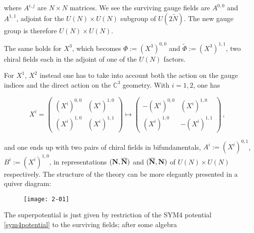where $A^{i,j}$ are $N\times N$ matrices. We see the surviving gauge fields are $A^{0,0}$ and $A^{1,1}$, adjoint for the $U(N) \times U(N)$ subgroup of $U(2\tilde N)$. The new gauge group is therefore $U(N) \times U(N)$.

The same holds for $X^3$, which becomes $\Phi := (X^3)^{0,0}$ and $\tilde \Phi := (X^3)^{1,1}$, two chiral fields each in the adjoint of one of the $U(N)$ factors.

For $X^1$, $X^2$ instead one has to take into account both the action on the gauge indices and the direct action on the $\mathbb{C}^3$ geometry. With $i=1,2$, one has

\begin{equation}
	X^i = \begin{pmatrix} 
			(X^i)^{0,0} & (X^i)^{1,0} \\
			(X^i)^{1,0} & (X^i)^{1,1} 
		\end{pmatrix}\mapsto \begin{pmatrix} 
			-(X^i)^{0,0} & (X^i)^{1,0} \\
			(X^i)^{1,0} & -(X^i)^{1,1} 
		\end{pmatrix}\,,
\end{equation}

and one ends up with two pairs of chiral fields in bifundamentals, $A^i := (X^i)^{0,1}$, $B^i := (X^i)^{1,0}$, in representations $(\mathbf{N}, \overline{\mathbf{N}})$ and $(\overline{\mathbf{N}}, \mathbf{N})$ of $U(N)\times U(N)$ respectively. The structure of the theory can be more elegantly presented in a quiver diagram:

\begin{figure}[H]
	\centering
	\texttt{[image: 2-01]}
\end{figure}

The superpotential is just given by restriction of the SYM4 potential \eqref{sym4potential} to the surviving fields; after some algebra

